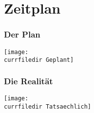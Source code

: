 \section{Zeitplan}

\begin{frame}\frametitle{Der Plan}
    \begin{center}
    \texttt{[image: \\currfiledir Geplant]}
    \end{center}
\end{frame}

\begin{frame}\frametitle{Die Realität}
    \begin{center}
    \texttt{[image: \\currfiledir Tatsaechlich]}
    \end{center}
\end{frame}